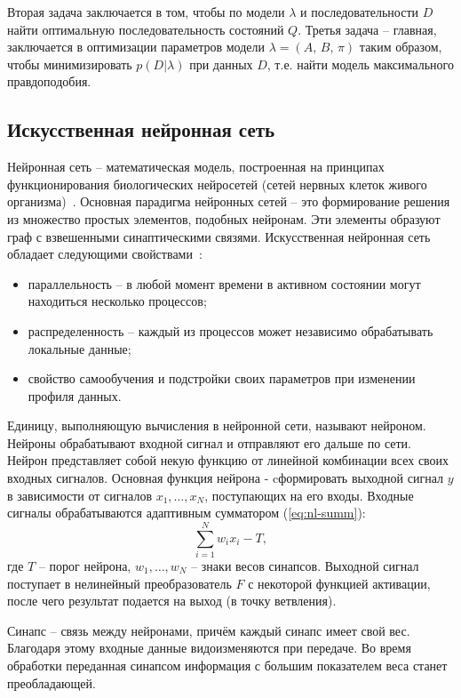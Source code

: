 Вторая задача заключается в том, чтобы по модели $\lambda$ и последовательности $D$ найти оптимальную последовательность состояний $Q$. Третья задача -- главная, заключается в оптимизации параметров модели $\lambda = (A,\,B,\,\pi)$ таким образом, чтобы минимизировать $p(D|\lambda)$ при данных $D$, т.е. найти модель максимального правдоподобия. 

\subsection{Искусственная нейронная сеть}
Нейронная сеть -- математическая модель, построенная на принципах функционирования биологических нейросетей (сетей нервных клеток живого организма)~\cite{nl}. Основная парадигма нейронных сетей -- это формирование решения из множество простых элементов, подобных нейронам. Эти элементы образуют граф с взвешенными синаптическими связями. Искусственная нейронная сеть обладает следующими свойствами~\cite{dukeNL}: 
\begin{itemize}
	\item параллельность -- в любой момент времени в активном состоянии могут находиться несколько процессов;
	\item распределенность -- каждый из процессов может независимо обрабатывать локальные данные;
	\item свойство самообучения и подстройки своих параметров при изменении профиля данных.
\end{itemize}

Единицу, выполняющую вычисления в нейронной сети, называют нейроном. Нейроны обрабатывают входной сигнал и отправляют его дальше по сети. Нейрон представляет собой некую функцию от линейной комбинации всех своих входных сигналов. Основная функция нейрона - cформировать выходной сигнал $y$ в зависимости от сигналов $x_1, \dots, x_N$, поступающих на его входы. Входные сигналы обрабатываются адаптивным сумматором (\ref{eq:nl-summ}):
\begin{equation}\label{eq:nl-summ}
	\sum_{i = 1}^{N} w_ix_i - T,
\end{equation}
где $T$ -- порог нейрона, $w_1, \dots, w_N$ -- знаки весов синапсов. Выходной сигнал поступает в нелинейный преобразователь $F$ с некоторой функцией активации, после чего результат подается на выход (в точку ветвления).

Синапс -- связь между нейронами, причём каждый синапс имеет свой вес. Благодаря этому входные данные видоизменяются при передаче. Во время обработки переданная синапсом информация с большим показателем веса станет преобладающей.


